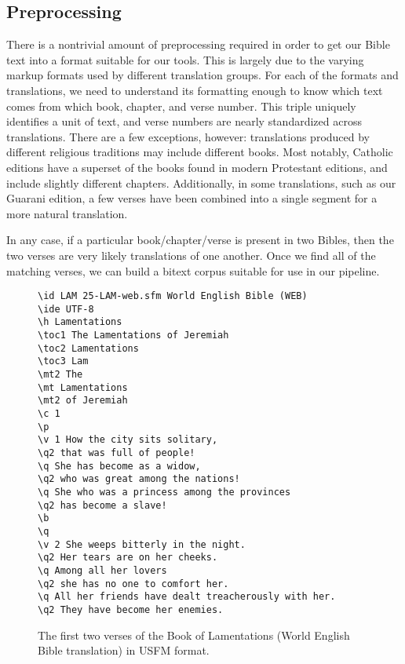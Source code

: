\subsection{Preprocessing}
There is a nontrivial amount of preprocessing required in order to get our
Bible text into a format suitable for our tools.  This is largely due to the
varying markup formats used by different translation groups.
For each of the formats and translations, we need to understand its formatting
enough to know which text comes from which book, chapter, and verse number.
This triple uniquely identifies a unit of text, and verse numbers are nearly
standardized across translations.  There are a few exceptions, however:
translations produced by different religious traditions may include different
books. Most notably, Catholic editions have a superset of the books found in
modern Protestant editions, and include slightly different chapters.
Additionally, in some translations, such as our Guarani edition, a few verses
have been combined into a single segment for a more natural translation.

In any case, if a particular book/chapter/verse is present in two Bibles, then
the two verses are very likely translations of one another. Once we find all of
the matching verses, we can build a bitext corpus suitable for use in our
pipeline.


\begin{figure*}
\raggedright \begin{verbatim}
\id LAM 25-LAM-web.sfm World English Bible (WEB) 
\ide UTF-8
\h Lamentations 
\toc1 The Lamentations of Jeremiah 
\toc2 Lamentations 
\toc3 Lam 
\mt2 The 
\mt Lamentations 
\mt2 of Jeremiah 
\c 1  
\p
\v 1 How the city sits solitary, 
\q2 that was full of people! 
\q She has become as a widow, 
\q2 who was great among the nations! 
\q She who was a princess among the provinces 
\q2 has become a slave! 
\b
\q
\v 2 She weeps bitterly in the night. 
\q2 Her tears are on her cheeks. 
\q Among all her lovers 
\q2 she has no one to comfort her. 
\q All her friends have dealt treacherously with her. 
\q2 They have become her enemies. 
\end{verbatim}
  \caption{The first two verses of the Book of Lamentations (World English
  Bible translation) in USFM format.}
  \label{fig:usfmsample}
\end{figure*}


